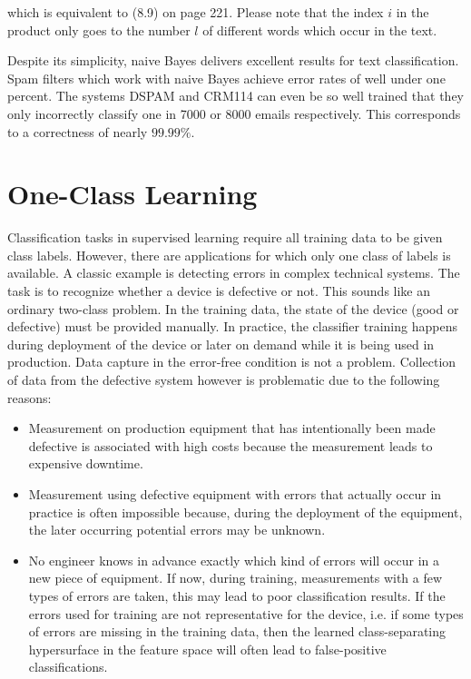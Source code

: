 \documentclass[10pt]{book}
\begin{document}
which is equivalent to (8.9) on page 221. Please note that the index $i$ in the product only goes to the number $l$ of different words which occur in the text.

Despite its simplicity, naive Bayes delivers excellent results for text classification. Spam filters which work with naive Bayes achieve error rates of well under one percent. The systems DSPAM and CRM114 can even be so well trained that they only incorrectly classify one in 7000 or 8000 emails respectively. This corresponds to a correctness of nearly $99.99 \%$.

\section{One-Class Learning}
Classification tasks in supervised learning require all training data to be given class labels. However, there are applications for which only one class of labels is available. A classic example is detecting errors in complex technical systems. The task is to recognize whether a device is defective or not. This sounds like an ordinary two-class problem. In the training data, the state of the device (good or defective) must be provided manually. In practice, the classifier training happens during deployment of the device or later on demand while it is being used in production. Data capture in the error-free condition is not a problem. Collection of data from the defective system however is problematic due to the following reasons:

\begin{itemize}
  \item Measurement on production equipment that has intentionally been made defective is associated with high costs because the measurement leads to expensive downtime.
  \item Measurement using defective equipment with errors that actually occur in practice is often impossible because, during the deployment of the equipment, the later occurring potential errors may be unknown.
  \item No engineer knows in advance exactly which kind of errors will occur in a new piece of equipment. If now, during training, measurements with a few types of errors are taken, this may lead to poor classification results. If the errors used for training are not representative for the device, i.e. if some types of errors are missing in the training data, then the learned class-separating hypersurface in the feature space will often lead to false-positive classifications.
\end{itemize}
\end{document}
